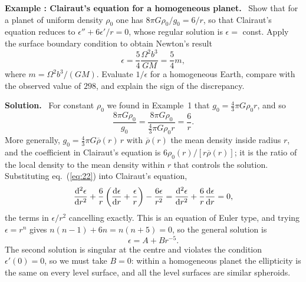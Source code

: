 \documentclass[a4paper,12pt]{paper}
\newcounter{example}
\renewenvironment{example}[1]{%
  \refstepcounter{example}%
  \begin{mdframed}[linewidth=1pt,innertopmargin=6pt,innerbottommargin=6pt]%
  \noindent\textbf{Example \theexample: #1.}\ }{%
  \end{mdframed}}
\newenvironment{solution}{\par\noindent\textbf{Solution.}\ }{\par\medskip}
\begin{document}
\begin{example}{Clairaut's equation for a homogeneous planet}
Show that for a planet of uniform density $\rho_{0}$ one has $8\pi G\rho_{0}/g_{0}=6/r$, so that
Clairaut's equation reduces to $\epsilon''+6\epsilon'/r=0$, whose regular solution is
$\epsilon=$ const. Apply the surface boundary condition to obtain Newton's result
\begin{equation*}
\epsilon=\frac{5}{4}\frac{\Omega^{2}b^{3}}{GM}=\frac{5}{4}m,
\end{equation*}
where $m=\Omega^{2}b^{3}/(GM)$. Evaluate $1/\epsilon$ for a homogeneous Earth, compare with the
observed value of $298$, and explain the sign of the discrepancy.
\end{example}

\begin{solution}
For constant $\rho_{0}$ we found in Example~1 that $g_{0}=\frac{4}{3}\pi G\rho_{0}r$, and so
\begin{equation}
\frac{8\pi G\rho_{0}}{g_{0}}=\frac{8\pi G\rho_{0}}{\frac{4}{3}\pi G\rho_{0}r}=\frac{6}{r}.
\label{eq:22}
\end{equation}
More generally, $g_{0}=\frac{4}{3}\pi G\overline{\rho}(r)\,r$ with $\overline{\rho}(r)$ the mean density
inside radius $r$, and the coefficient in Clairaut's equation is $6\rho_{0}(r)/[r\overline{\rho}(r)]$;
it is the ratio of the local density to the mean density within $r$ that controls the solution.
Substituting eq.~(\ref{eq:22}) into Clairaut's equation,
\begin{equation}
\frac{\mathrm{d}^{2}\epsilon}{\mathrm{d} r^{2}}+\frac{6}{r}\left(\frac{\mathrm{d}\epsilon}{\mathrm{d} r}+\frac{\epsilon}{r}\right)-\frac{6\epsilon}{r^{2}}
=\frac{\mathrm{d}^{2}\epsilon}{\mathrm{d} r^{2}}+\frac{6}{r}\frac{\mathrm{d}\epsilon}{\mathrm{d} r}=0,
\label{eq:23}
\end{equation}
the terms in $\epsilon/r^{2}$ cancelling exactly. This is an equation of Euler type, and trying
$\epsilon=r^{n}$ gives $n(n-1)+6n=n(n+5)=0$, so the general solution is
\begin{equation}
\epsilon=A+Br^{-5}.
\label{eq:24}
\end{equation}
The second solution is singular at the centre and violates the condition
$\epsilon'(0)=0$, so we must take $B=0$: within a homogeneous planet the ellipticity is the same
on every level surface, and all the level surfaces are similar spheroids.


\end{solution}
\end{document}
